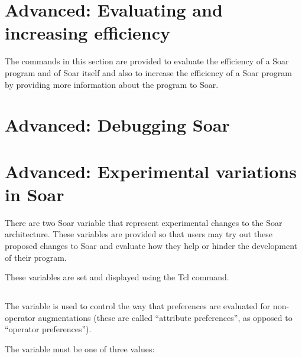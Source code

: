 {\section{Advanced: Evaluating and increasing efficiency}

The commands in this section are provided to evaluate the efficiency of a Soar
program and of Soar itself and also to increase the efficiency of a Soar
program by providing more information about the program to Soar.

\section{Advanced: Debugging Soar}

\section{Advanced: Experimental variations in Soar}

There are two Soar variable that represent experimental changes to the Soar
architecture. These variables are provided so that users may try out these
proposed changes to Soar and evaluate how they help or hinder the development
of their program.

These variables are set and displayed using the Tcl  command.



\subsection{ \soar{ [ 0 | 1 | 2 ] }}
\label{attribute-preferences-mode}

The  variable is used to control the way
that preferences are evaluated for non-operator augmentations (these are
called ``attribute preferences'', as opposed to ``operator preferences'').

The  variable must be one of three values:

}
